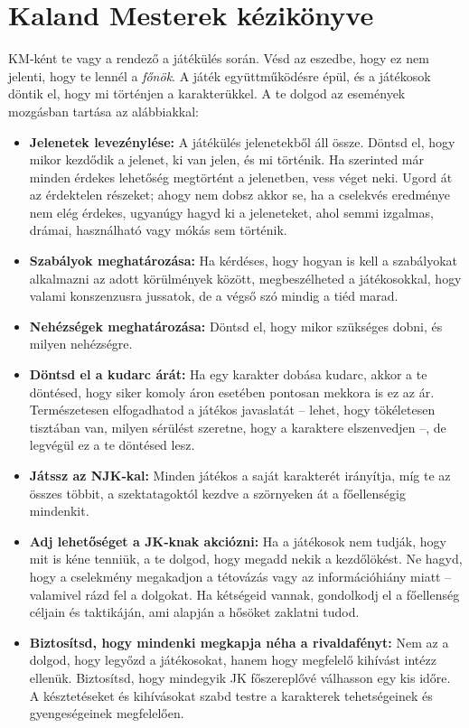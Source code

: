 \chapter{Kaland Mesterek kézikönyve}

KM‑ként te vagy a rendező a játékülés során. Vésd az eszedbe, hogy ez nem jelenti, hogy te lennél a \emph{főnök}. A  játék együttműködésre épül, és a játékosok döntik el, hogy mi történjen a karakterükkel. A te dolgod az események mozgásban tartása az alábbiakkal:

\begin{itemize}
    \item \textbf{Jelenetek levezénylése:} A játékülés jelenetekből áll össze. Döntsd el, hogy mikor kezdődik a jelenet, ki van jelen, és mi történik. Ha szerinted már minden érdekes lehetőség megtörtént a jelenetben, vess véget neki. Ugord át az érdektelen részeket; ahogy nem dobsz akkor se, ha a cselekvés eredménye nem elég érdekes, ugyanúgy hagyd ki a jeleneteket, ahol semmi izgalmas, drámai, használható vagy mókás sem történik.
    \item \textbf{Szabályok meghatározása:} Ha kérdéses, hogy hogyan is kell a szabályokat alkalmazni az adott körülmények között, megbeszélheted a játékosokkal, hogy valami konszenzusra jussatok, de a végső szó mindig a tiéd marad.
    \item \textbf{Nehézségek meghatározása:} Döntsd el, hogy mikor szükséges dobni, és milyen nehézségre.
    \item \textbf{Döntsd el a kudarc árát:} Ha egy karakter dobása kudarc, akkor a te döntésed, hogy siker komoly áron esetében pontosan mekkora is ez az ár. Természetesen elfogadhatod a játékos javaslatát – lehet, hogy tökéletesen tisztában van, milyen sérülést szeretne, hogy a karaktere elszenvedjen –, de legvégül ez a te döntésed lesz.
    \item \textbf{Játssz az NJK‑kal:} Minden játékos a saját karakterét irányítja, míg te az összes többit, a szektatagoktól kezdve a szörnyeken át a főellenségig mindenkit.
    \item \textbf{Adj lehetőséget a JK‑knak akciózni:} Ha a játékosok nem tudják, hogy mit is kéne tenniük, a te dolgod, hogy megadd nekik a kezdőlökést. Ne hagyd, hogy a cselekmény megakadjon a tétovázás vagy az információhiány miatt – valamivel rázd fel a dolgokat. Ha kétségeid vannak, gondolkodj el a főellenség  céljain és taktikáján, ami alapján a hősöket zaklatni tudod.
    \item \textbf{Biztosítsd, hogy mindenki megkapja néha a rivaldafényt:} Nem az a dolgod, hogy legyőzd a játékosokat, hanem hogy megfelelő kihívást intézz ellenük. Biztosítsd, hogy mindegyik JK főszereplővé válhasson egy kis időre. A késztetéseket és kihívásokat szabd testre a karakterek tehetségeinek és gyengeségeinek megfelelően.

\end{itemize}
